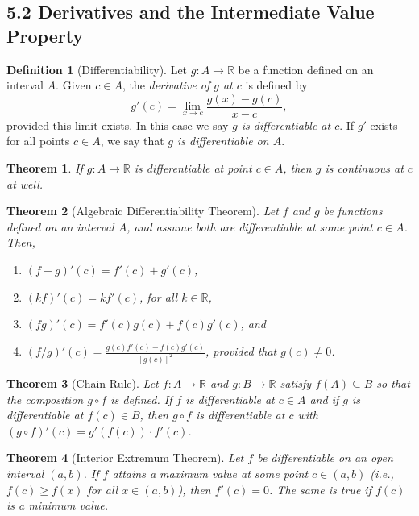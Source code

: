 \documentclass{amsart}
\newtheorem*{theorem}{Theorem}
\theoremstyle{definition}
\newtheorem*{definition}{Definition}
\newcommand{\R}{\mathbb{R}}
\begin{document}
\subsection*{5.2 Derivatives and the Intermediate Value Property}

\begin{definition}[Differentiability]
  Let $g : A \to \R$ be a function defined on an interval $A$. Given $c \in A$,
  the \emph{derivative of $g$ at $c$} is defined by
  \[
    g'(c) = \lim_{x \to c} \frac{g(x) - g(c)}{x - c},
  \]
  provided this limit exists. In this case we say \emph{$g$ is differentiable at
  $c$}. If $g'$ exists for all points $c \in A$, we say that \emph{$g$ is
  differentiable on $A$}.
\end{definition}

\begin{theorem}
  If $g : A \to \R$ is differentiable at point $c \in A$, then $g$ is continuous
  at $c$ at well.
\end{theorem}

\begin{theorem}[Algebraic Differentiability Theorem]
  Let $f$ and $g$ be functions defined on an interval $A$, and assume both are
  differentiable at some point $c \in A$. Then,
  \begin{enumerate}[label={(\roman*)}]
    \item $(f + g)'(c) = f'(c) + g'(c)$,
    \item $(kf)'(c) = k f'(c)$, for all $k \in \R$,
    \item $(fg)'(c) = f'(c) g(c) + f(c) g'(c)$, and
    \item $(f/g)'(c) = \frac{g(c) f'(c) - f(c) g'(c)}{{[g(c)]}^2}$, provided
      that $g(c) \neq 0$.
  \end{enumerate}
\end{theorem}

\begin{theorem}[Chain Rule]
  Let $f : A \to \R$ and $g : B \to \R$ satisfy $f(A) \subseteq B$ so that the
  composition $g \circ f$ is defined. If $f$ is differentiable at $c \in A$ and
  if $g$ is differentiable at $f(c) \in B$, then $g \circ f$ is differentiable
  at $c$ with $(g \circ f)'(c) = g'(f(c)) \cdot f'(c)$.
\end{theorem}

\begin{theorem}[Interior Extremum Theorem]
  Let $f$ be differentiable on an open interval $(a, b)$. If $f$ attains a
  maximum value at some point $c \in (a, b)$ (i.e., $f(c) \ge f(x)$ for all $x
  \in (a, b)$), then $f'(c) = 0$. The same is true if $f(c)$ is a minimum value.
\end{theorem}
\end{document}
